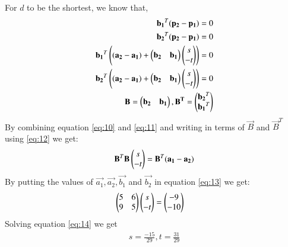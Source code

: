 \documentclass[journal,12pt,twocolumn]{IEEEtran}
\begin{document}
For $d$ to be the shortest, we know that,
\begin{align}
\mathbf{b_1}^T(\mathbf{p_2}-\mathbf{p_1})=0\\
\mathbf{b_2}^T(\mathbf{p_2}-\mathbf{p_1})=0\\
\mathbf{b_1}^T\left((\mathbf{a_2}-\mathbf{a_1})+\begin{pmatrix}\mathbf{b_2}&\mathbf{b_1}\end{pmatrix}\begin{pmatrix}s\\-t\end{pmatrix}\right)=0\label{eq:10}\\
\mathbf{b_2}^T\left((\mathbf{a_2}-\mathbf{a_1})+\begin{pmatrix}\mathbf{b_2}&\mathbf{b_1}\end{pmatrix}\begin{pmatrix}s\\-t\end{pmatrix}\right)=0\label{eq:11}\\
\mathbf{B}= \begin{pmatrix}\mathbf{b_2}&\mathbf{b_1}\end{pmatrix}, \mathbf{B^T}= \begin{pmatrix}\mathbf{b_2}^T\\\mathbf{b_1}^T\end{pmatrix}\label{eq:12}
\end{align}
By combining equation \eqref{eq:10} and \eqref{eq:11} and writing in terms of $\vec{B}$ and $\vec{B}^T$ using \eqref{eq:12} we get:
\begin{align}
\mathbf{B}^T\mathbf{B}\begin{pmatrix}s\\-t\end{pmatrix}=\mathbf{B}^T(\mathbf{a_1}-\mathbf{a_2})\label{eq:13}
\end{align}
By putting the values of $\vec{a_1}, \vec{a_2}, \vec{b_1}$ and $\vec{b_2}$ in equation \eqref{eq:13} we get:
\begin{align}
\begin{pmatrix}5&6\\9&5\end{pmatrix}\begin{pmatrix}s\\-t\end{pmatrix}&=\begin{pmatrix}-9\\-10\end{pmatrix}\label{eq:14}
\end{align}
Solving equation \eqref{eq:14} we get
\begin{align}
    s=\frac{-15}{29}, t=\frac{31}{29}
\end{align}
\end{document}
